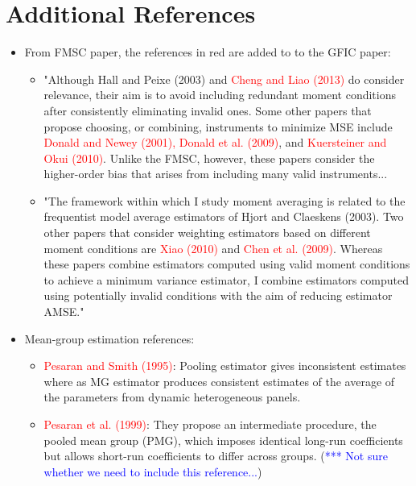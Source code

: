 \documentclass[11pt]{article}
\begin{document}



\doublespacing



\section*{Additional References}

\begin{itemize}
\item From FMSC paper, the references in red are added to to the GFIC paper:
\begin{itemize}
\item "Although Hall and Peixe (2003) and \textcolor{red}{Cheng and Liao (2013)} do consider relevance,  their aim is to avoid including redundant moment conditions after consistently eliminating invalid ones.  Some other papers that propose choosing, or combining, instruments to minimize MSE include \textcolor{red}{Donald and Newey (2001), Donald et al. (2009)}, and \textcolor{red}{Kuersteiner and Okui (2010)}.  Unlike the FMSC, however, these papers consider the higher-order bias that arises from including many valid instruments...
\item "The  framework  within  which  I  study  moment  averaging  is  related  to  the  frequentist model average estimators of Hjort and Claeskens (2003).  Two other papers that consider weighting estimators based on different moment conditions are \textcolor{red}{Xiao (2010)} and \textcolor{red}{Chen et al.
(2009)}. Whereas these papers combine estimators computed using valid moment conditions to achieve a minimum variance estimator, I combine estimators computed using potentially invalid conditions with the aim of reducing estimator AMSE." 
\end{itemize}
\item Mean-group estimation references:
\begin{itemize}
\item \textcolor{red}{Pesaran and Smith (1995)}: Pooling estimator gives inconsistent estimates where as MG estimator produces consistent estimates of the average of the parameters from dynamic heterogeneous panels.
\item \textcolor{red}{Pesaran et al. (1999)}: They propose an intermediate procedure, the pooled mean group (PMG), which imposes identical long-run coefficients but allows short-run coefficients to differ across groups. (\textcolor{blue}{*** Not sure whether we need to include this reference...})

\end{itemize}
\end{itemize}
\end{document}
